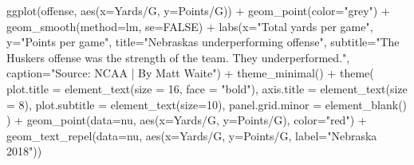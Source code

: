 \documentclass[
]{book}
\newenvironment{Shaded}{\begin{snugshade}}{\end{snugshade}}
\newcommand{\AttributeTok}[1]{\textcolor[rgb]{0.77,0.63,0.00}{#1}}
\newcommand{\ConstantTok}[1]{\textcolor[rgb]{0.00,0.00,0.00}{#1}}
\newcommand{\DecValTok}[1]{\textcolor[rgb]{0.00,0.00,0.81}{#1}}
\newcommand{\FunctionTok}[1]{\textcolor[rgb]{0.00,0.00,0.00}{#1}}
\newcommand{\NormalTok}[1]{#1}
\newcommand{\SpecialCharTok}[1]{\textcolor[rgb]{0.00,0.00,0.00}{#1}}
\newcommand{\StringTok}[1]{\textcolor[rgb]{0.31,0.60,0.02}{#1}}
\begin{document}
\begin{Shaded}
\begin{Highlighting}[]
\FunctionTok{ggplot}\NormalTok{(offense, }\FunctionTok{aes}\NormalTok{(}\AttributeTok{x=}\StringTok{\textasciigrave{}}\AttributeTok{Yards/G}\StringTok{\textasciigrave{}}\NormalTok{, }\AttributeTok{y=}\StringTok{\textasciigrave{}}\AttributeTok{Points/G}\StringTok{\textasciigrave{}}\NormalTok{)) }\SpecialCharTok{+} 
  \FunctionTok{geom\_point}\NormalTok{(}\AttributeTok{color=}\StringTok{"grey"}\NormalTok{) }\SpecialCharTok{+} \FunctionTok{geom\_smooth}\NormalTok{(}\AttributeTok{method=}\NormalTok{lm, }\AttributeTok{se=}\ConstantTok{FALSE}\NormalTok{) }\SpecialCharTok{+} 
  \FunctionTok{labs}\NormalTok{(}\AttributeTok{x=}\StringTok{"Total yards per game"}\NormalTok{, }\AttributeTok{y=}\StringTok{"Points per game"}\NormalTok{, }\AttributeTok{title=}\StringTok{"Nebraska\textquotesingle{}s underperforming offense"}\NormalTok{, }\AttributeTok{subtitle=}\StringTok{"The Husker\textquotesingle{}s offense was the strength of the team. They underperformed."}\NormalTok{, }\AttributeTok{caption=}\StringTok{"Source: NCAA | By Matt Waite"}\NormalTok{) }\SpecialCharTok{+} 
  \FunctionTok{theme\_minimal}\NormalTok{() }\SpecialCharTok{+} 
  \FunctionTok{theme}\NormalTok{(}
    \AttributeTok{plot.title =} \FunctionTok{element\_text}\NormalTok{(}\AttributeTok{size =} \DecValTok{16}\NormalTok{, }\AttributeTok{face =} \StringTok{"bold"}\NormalTok{),}
    \AttributeTok{axis.title =} \FunctionTok{element\_text}\NormalTok{(}\AttributeTok{size =} \DecValTok{8}\NormalTok{), }
    \AttributeTok{plot.subtitle =} \FunctionTok{element\_text}\NormalTok{(}\AttributeTok{size=}\DecValTok{10}\NormalTok{), }
    \AttributeTok{panel.grid.minor =} \FunctionTok{element\_blank}\NormalTok{()}
\NormalTok{    ) }\SpecialCharTok{+}
  \FunctionTok{geom\_point}\NormalTok{(}\AttributeTok{data=}\NormalTok{nu, }\FunctionTok{aes}\NormalTok{(}\AttributeTok{x=}\StringTok{\textasciigrave{}}\AttributeTok{Yards/G}\StringTok{\textasciigrave{}}\NormalTok{, }\AttributeTok{y=}\StringTok{\textasciigrave{}}\AttributeTok{Points/G}\StringTok{\textasciigrave{}}\NormalTok{), }\AttributeTok{color=}\StringTok{"red"}\NormalTok{) }\SpecialCharTok{+} 
  \FunctionTok{geom\_text\_repel}\NormalTok{(}\AttributeTok{data=}\NormalTok{nu, }\FunctionTok{aes}\NormalTok{(}\AttributeTok{x=}\StringTok{\textasciigrave{}}\AttributeTok{Yards/G}\StringTok{\textasciigrave{}}\NormalTok{, }\AttributeTok{y=}\StringTok{\textasciigrave{}}\AttributeTok{Points/G}\StringTok{\textasciigrave{}}\NormalTok{, }\AttributeTok{label=}\StringTok{"Nebraska 2018"}\NormalTok{))}
\end{Highlighting}
\end{Shaded}
\end{document}
